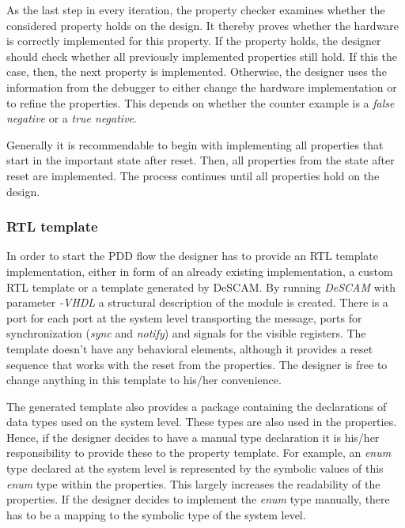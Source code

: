 As the last step in every iteration, the property checker examines whether the considered property holds on the design. 
It thereby proves whether the hardware is correctly implemented for this property. 
If the property holds, the designer should check whether all previously implemented properties still hold. 
If this the case, then, the next property is implemented.
Otherwise, the designer uses the information from the debugger to either change the hardware implementation or to refine the properties.
This depends on whether the counter example is a \textit{false negative} or a \textit{true negative}. 

Generally it is recommendable to begin with implementing all properties that start in the important state after reset. 
Then, all properties from the state after reset are implemented. 
The process continues until all properties hold on the design. 

\subsubsection{RTL template}

In order to start the PDD flow the designer has to provide an RTL template implementation, either in form of an already existing implementation, a custom RTL template or a template generated by DeSCAM.
By running \textit{DeSCAM} with parameter \textit{-VHDL} a structural description of the module is created.
There is a port for each port at the system level transporting the message, ports for synchronization (\textit{sync} and \textit{notify}) and signals for the visible registers. 
The template doesn't have any behavioral elements, although it provides a reset sequence that works with the reset from the properties. 
The designer is free to change anything in this template to his/her convenience. 

The generated template also provides a package containing the declarations of data types used on the system level. 
These types are also used in the properties. 
Hence, if the designer decides to have a manual type declaration it is his/her responsibility to provide these to the property template. 
For example, an \textit{enum} type declared at the system level is represented by the symbolic values of this \textit{enum} type within the properties. 
This largely increases the readability of the properties. 
If the designer decides to implement the \textit{enum} type manually, there has to be a mapping to the symbolic type of the system level.    

